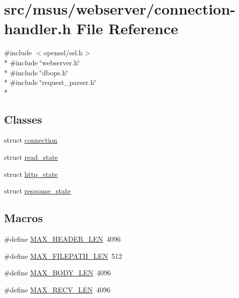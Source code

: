 \hypertarget{connection-handler_8h}{\section{src/msus/webserver/connection-\/handler.h File Reference}
\label{connection-handler_8h}
}
{\ttfamily \#include $<$openssl/ssl.\-h$>$}\\*
{\ttfamily \#include \char`\"{}webserver.\-h\char`\"{}}\\*
{\ttfamily \#include \char`\"{}dbops.\-h\char`\"{}}\\*
{\ttfamily \#include \char`\"{}request\-\_\-parser.\-h\char`\"{}}\\*
\subsection*{Classes}
\begin{DoxyCompactItemize}
\item 
struct \hyperlink{structconnection}{connection}
\item 
struct \hyperlink{structread__state}{read\-\_\-state}
\item 
struct \hyperlink{structhttp__state}{http\-\_\-state}
\item 
struct \hyperlink{structresponse__state}{response\-\_\-state}
\end{DoxyCompactItemize}
\subsection*{Macros}
\begin{DoxyCompactItemize}
\item 
\#define \hyperlink{connection-handler_8h_a76e334e12a376a91d58c9ec5ae9a7abf}{M\-A\-X\-\_\-\-H\-E\-A\-D\-E\-R\-\_\-\-L\-E\-N}~4096
\item 
\#define \hyperlink{connection-handler_8h_a55d3700b57daefe139c225b101a6d89f}{M\-A\-X\-\_\-\-F\-I\-L\-E\-P\-A\-T\-H\-\_\-\-L\-E\-N}~512
\item 
\#define \hyperlink{connection-handler_8h_ab5d508eee849407d84f67ece294ac8b0}{M\-A\-X\-\_\-\-B\-O\-D\-Y\-\_\-\-L\-E\-N}~4096
\item 
\#define \hyperlink{connection-handler_8h_a774d5c0d74bbc47fad33f175a0bd13f4}{M\-A\-X\-\_\-\-R\-E\-C\-V\-\_\-\-L\-E\-N}~4096
\end{DoxyCompactItemize}
